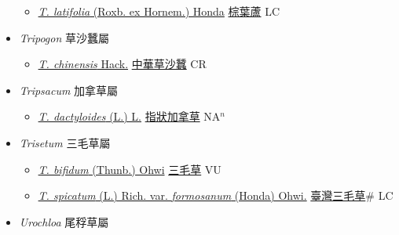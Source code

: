 \begin{itemize}
  \begin{itemize}
        \item[] \href{http://www.theplantlist.org/tpl1.1/search?q=Thysanolaena+latifolia}{\textit{T. latifolia} (Roxb. ex Hornem.) Honda}   \href{\detokenize{http://taibnet.sinica.edu.tw/chi/taibnet_species_list.php?T2=棕葉蘆&T2_new_value=true&fr=y}}{棕葉蘆} LC
  \end{itemize}
 \item[] \textit{Tripogon} 草沙蠶屬
                    
  \begin{itemize}
        \item[] \href{http://www.theplantlist.org/tpl1.1/search?q=Tripogon+chinensis}{\textit{T. chinensis} Hack.}   \href{\detokenize{http://taibnet.sinica.edu.tw/chi/taibnet_species_list.php?T2=中華草沙蠶&T2_new_value=true&fr=y}}{中華草沙蠶} CR
  \end{itemize}
 \item[] \textit{Tripsacum} 加拿草屬
                    
  \begin{itemize}
        \item[] \href{http://www.theplantlist.org/tpl1.1/search?q=Tripsacum+dactyloides}{\textit{T. dactyloides} (L.) L.}   \href{\detokenize{http://taibnet.sinica.edu.tw/chi/taibnet_species_list.php?T2=指狀加拿草&T2_new_value=true&fr=y}}{指狀加拿草} NA$^n$
  \end{itemize}
 \item[] \textit{Trisetum} 三毛草屬
                    
  \begin{itemize}
        \item[] \href{http://www.theplantlist.org/tpl1.1/search?q=Trisetum+bifidum}{\textit{T. bifidum} (Thunb.) Ohwi}   \href{\detokenize{http://taibnet.sinica.edu.tw/chi/taibnet_species_list.php?T2=三毛草&T2_new_value=true&fr=y}}{三毛草} VU
        \item[] \href{http://www.theplantlist.org/tpl1.1/search?q=Trisetum+spicatum+var.+formosanum}{\textit{T. spicatum} (L.) Rich. var. \textit{formosanum} (Honda) Ohwi.}   \href{\detokenize{http://taibnet.sinica.edu.tw/chi/taibnet_species_list.php?T2=臺灣三毛草&T2_new_value=true&fr=y}}{臺灣三毛草}\# LC
  \end{itemize}
 \item[] \textit{Urochloa} 尾稃草屬
                    

\end{itemize}
